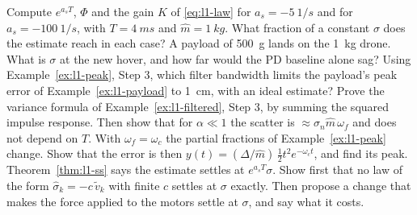 \begin{exercises}
\exercise[1] Compute $e^{a_sT}$, $\Phi$ and the gain $K$ of \cref{eq:l1-law} for $a_s = \SI{-5}{1/s}$ and for $a_s = \SI{-100}{1/s}$, with $T = \SI{4}{ms}$ and $\hat m = \SI{1}{kg}$. What fraction of a constant $\sigma$ does the estimate reach in each case?
\exercise[1] A payload of \SI{500}{g} lands on the \SI{1}{kg} drone. What is $\sigma$ at the new hover, and how far would the PD baseline alone sag?
\exercise[1] Using Example~\ref{ex:l1-peak}, Step 3, which filter bandwidth limits the payload's peak error of Example~\ref{ex:l1-payload} to \SI{1}{cm}, with an ideal estimate?
\exercise[2] Prove the variance formula of Example~\ref{ex:l1-filtered}, Step 3, by summing the squared impulse response. Then show that for $\alpha \ll 1$ the scatter is $\approx \sigma_n\hat m\,\omega_f$ and does not depend on $T$.
\exercise[2] With $\omega_f = \omega_c$ the partial fractions of Example~\ref{ex:l1-peak} change. Show that the error is then $y(t) = (\Delta/\hat m)\,\tfrac12 t^2e^{-\omega_ct}$, and find its peak.
\exercise[2] Theorem~\ref{thm:l1-ss} says the estimate settles at $e^{a_sT}\sigma$. Show first that no law of the form $\hat\sigma_k = -c\,\tilde v_k$ with finite $c$ settles at $\sigma$ exactly. Then propose a change that makes the force applied to the motors settle at $\sigma$, and say what it costs.

\end{exercises}
